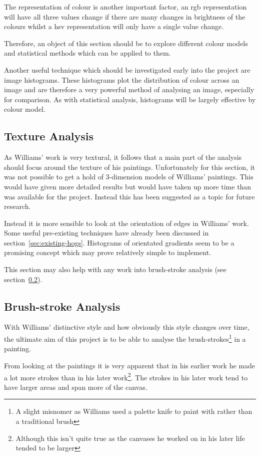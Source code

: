 The representation of colour is another important factor, an \gls{rgb} representation will have all 
three values change if there are many changes in brightness of the colours whilst a \gls{hsv} 
representation will only have a single value change.

Therefore, an object of this section should be to explore different colour models and statistical
methods which can be applied to them.

Another useful technique which should be investigated early into the project are image histograms.
These histograms plot the distribution of colour across an image and are therefore a very powerful
method of analysing an image, especially for comparison. As with statistical analysis, histograms
will be largely effective by colour model.

\subsection{Texture Analysis}
As Williams' work is very textural, it follows that a main part of the analysis should
focus around the texture of his paintings. Unfortunately for this section, it was not possible to
get a hold of 3-dimension models of Williams' paintings. This would have given more
detailed results but would have taken up more time than was available for the project. Instead this has been 
suggested as a topic for future research.

Instead it is more sensible to look at the orientation of edges in Williams' work. Some useful 
pre-existing techniques have already been discussed in section~\ref{sec:existing-hogs}. Histograms
of orientated gradients\cite{Dalal2005Histograms} seem to be a promising concept which may prove 
relatively simple to implement.

This section may also help with any work into brush-stroke analysis (see 
section~\ref{sec:analysis-brush-stroke}).

\subsection{Brush-stroke Analysis}\label{sec:analysis-brush-stroke}
With Williams' distinctive style and how obviously this style changes over time, the ultimate aim 
of this project is to be able to analyse the brush-strokes\footnote{A slight misnomer as Williams 
used a palette knife to paint with rather than a traditional brush} in a painting.

From looking at the paintings it is very apparent that in his earlier work he made a lot more 
strokes than in his later work\footnote{Although this isn't quite true as the canvases he worked
on in his later life tended to be larger}. The strokes in his later work tend to have larger areas
and span more of the canvas.

